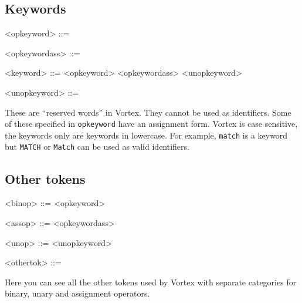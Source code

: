 \documentclass{article}
\newenvironment{bnf}
{
\begin{mdframed}
\begin{grammar}
}
{
\end{grammar}
\end{mdframed}
}
\begin{document}
\subsection{Keywords}
\begin{bnf}
<opkeyword> ::= 
    \alt {}
    \alt {}
    \alt {}
    \alt {}
    \alt {}
    \alt {}
    \alt {}

<opkeywordass> ::= 
    \alt {}
    \alt {}
    \alt {}
    \alt {}
    \alt {}

<keyword> ::= 
    \alt {}
    \alt {}
    \alt {}
    \alt {}
    \alt {}
    \alt {}
    \alt {}
    \alt {}
    \alt {}
    \alt {}
    \alt {}
    \alt {}
    \alt {}
    \alt {}
    \alt {}
    \alt {}
    \alt {}
    \alt {}
    \alt {}
    \alt {}
    \alt {}
    \alt {}
    \alt {}
    \alt {}
    \alt {}
    \alt {}
    \alt {}
    \alt {}
    \alt {}
    \alt {}
    \alt {}
    \alt {}
    \alt {}
    \alt {}
    \alt {}
    \alt {}
    \alt {}
    \alt {}
    \alt {}
    \alt <opkeyword>
    \alt <opkeywordass>
    \alt <unopkeyword>

<unopkeyword> ::= 
    \alt {}
\end{bnf}
These are \enquote{reserved words} in Vortex. They cannot be used as
identifiers. Some of these specified in \verb|opkeyword| have an assignment
form. Vortex is case sensitive, the keywords only are keywords in lowercase.
For example, \verb|match| is a keyword but \verb|MATCH| or \verb|Match| can
be used as valid identifiers.
\subsection{Other tokens}
\begin{bnf}
<binop> ::= \lit{=}
    \alt \lit{==}
    \alt \lit{\textgreater}
    \alt \lit{\textgreater=}
    \alt \lit{\textless}
    \alt \lit{\textless=}
    \alt \lit{!=}
    \alt \lit{\%}
    \alt \lit{~}
    \alt \lit{+}
    \alt \lit{++}
    \alt \lit{*}
    \alt \lit{**}
    \alt \lit{-}
    \alt \lit{/}
    \alt \lit{::}
    \alt <opkeyword>

<assop> ::= \lit{~=}
    \alt \lit{+=}
    \alt \lit{++=}
    \alt \lit{*=}
    \alt \lit{**=}
    \alt \lit{-=}
    \alt \lit{/=}
    \alt \lit{::=}
    \alt \lit{\%=}
    \alt <opkeywordass>

<unop> ::= \lit{-}
    \alt \lit{\#}
    \alt <unopkeyword>

<othertok> ::= \lit{(}
    \alt \lit{)}
    \alt \lit{->}
    \alt {}
    \alt {}
    \alt {}
    \alt \lit{;}
    \alt \lit{;;}
    \alt \lit{\$}
    \alt \lit{\$(}
\end{bnf}
Here you can see all the other tokens used by Vortex with separate categories
for binary, unary and assignment operators.
\end{document}
